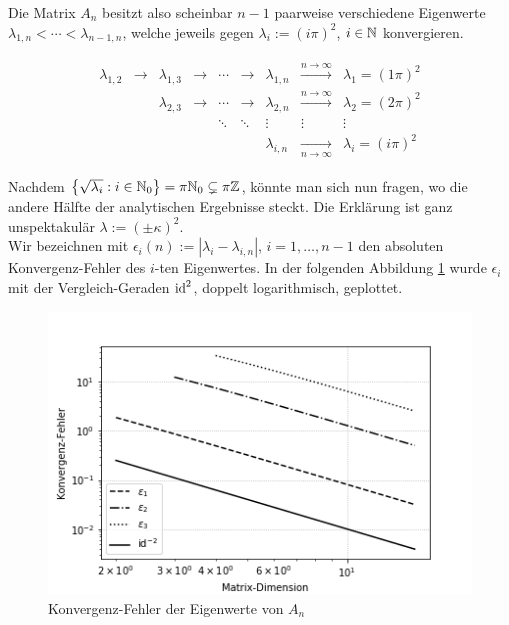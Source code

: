 Die Matrix $A_n$ besitzt also scheinbar $n-1$ paarweise verschiedene Eigenwerte $\lambda_{1, n} < \cdots < \lambda_{n-1, n}$, welche jeweils gegen $\lambda_i := (i \pi)^2$, $i \in \mathbb{N}$ konvergieren.

\begin{align} \label{Konvergenz_EW}
\begin{array}{ccccccccc}
\lambda_{1, 2} & \rightarrow & \lambda_{1, 3} & \rightarrow & \cdots & \rightarrow & \lambda_{1, n} & \xrightarrow{n \to \infty}   & \lambda_1 = (1 \pi)^2 \\
               &             & \lambda_{2, 3} & \rightarrow & \cdots & \rightarrow & \lambda_{2, n} & \xrightarrow{n \to \infty}   & \lambda_2 = (2 \pi)^2 \\
               &             &                &             & \ddots & \ddots      & \vdots         & \vdots                       & \vdots                \\
               &             &                &             &        &             & \lambda_{i, n} & \xrightarrow[n \to \infty]{} & \lambda_i = (i \pi)^2
\end{array}
\end{align}

Nachdem ${\left \{ \sqrt{\lambda_i}: i \in \mathbb{N}_0 \right \}} = \pi \mathbb{N}_0 \subsetneq \pi \mathbb{Z}$, könnte man sich nun fragen, wo die andere Hälfte der analytischen Ergebnisse steckt. Die Erklärung ist ganz unspektakulär $\lambda := (\pm \kappa)^2$. \\

Wir bezeichnen mit $\epsilon_i(n) := |\lambda_i - \lambda_{i, n}|$, $i = 1, \ldots, n-1$ den absoluten Konvergenz-Fehler des $i$-ten Eigenwertes. In der folgenden Abbildung \ref{fig:Konvergenz-Fehler_EW} wurde $\epsilon_i$ mit der Vergleich-Geraden $\mathrm{id}^2$, doppelt logarithmisch, geplottet. \\

\begin{figure}[H]
  \centering
  \includegraphics[width = 0.5 \textwidth]{Aufgabe_2/images/plot_eigen_value_errors(n_max = 16, i_max = 3)}
  \caption{Konvergenz-Fehler der Eigenwerte von $A_n$}
  \label{fig:Konvergenz-Fehler_EW}
\end{figure}

